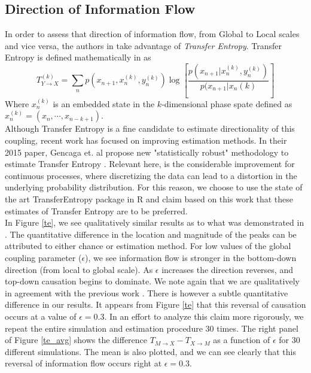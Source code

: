 \documentclass[conference]{IEEEtran}
\begin{document}
\subsection{Direction of Information Flow}
\noindent In order to assess that direction of information flow, from Global to Local scales and vice versa, the authors in \cite{Walker} take advantage of {\it Transfer Entropy}. Transfer Entropy is defined mathematically in \cite{Schreiber} as
$$T^{(k)}_{Y \rightarrow X} = \sum_n p(x_{n+1}, x_n^{(k)}, y_n^{(k)}) \log \left[ \frac{p(x_{n+1}|x_n^{(k)}, y_n^{(k)})}{p(x_{n+1}|x_n{(k)}}\right]$$
Where $x_n^{(k)}$ is an embedded state in the $k$-dimensional phase spate defined as $x_n^{(k)} = (x_n, \cdots, x_{n-k+1})$. \\



\noindent Although Transfer Entropy is a fine candidate to estimate directionality of this coupling, recent work has focused on improving estimation methods. In their 2015 paper, Gencaga et. al propose new "statistically robust" methodology to estimate Transfer Entropy \cite{recipe}. Relevant here, is the considerable improvement for continuous processes, where discretizing the data can lead to a distortion in the underlying probability distribution. For this reason, we choose to use the state of the art TransferEntropy package in R and claim based on this work that these estimates of Transfer Entropy are to be preferred. \\

\noindent In Figure \ref{te}, we see qualitatively similar results as to what was demonstrated in \cite{Walker}. The quantitative difference in the location and magnitude of the peaks can be attributed to either chance or estimation method. For low values of the global coupling parameter ($\epsilon$), we see information flow is stronger in the bottom-down direction (from local to global scale). As $\epsilon$ increases the direction reverses, and top-down causation begins to dominate. We note again that we are qualitatively in agreement with the previous work \cite{Walker}. There is however a subtle quantitative difference in our results. It appears from Figure \ref{te} that this reversal of causation occurs at a value of $\epsilon = 0.3$. In an effort to analyze this claim more rigorously, we repeat the entire simulation and estimation procedure $30$ times. The right panel of Figure \ref{te_avg} shows the difference $T_{M\rightarrow X} - T_{X \rightarrow M}$ as a function of $\epsilon$ for 30 different simulations. The mean is also plotted, and we can see clearly that this reversal of information flow occurs right at $\epsilon = 0.3$.
\end{document}
